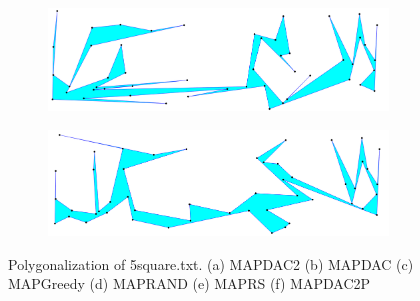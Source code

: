 \documentclass[conference]{IEEEtran}
\begin{document}
\begin{figure}[htbp]
			\begin{subfigure}{0.85\linewidth}
				\centering
				\includegraphics[width=0.99\textwidth]{fig6e.png}
				\caption{}
				\label{fig6e}
			\end{subfigure}
			
			\begin{subfigure}{0.85\linewidth}
				\centering
				\includegraphics[width=0.99\textwidth]{fig6f.png}
				\caption{}
				\label{fig6f}
			\end{subfigure}
			
			\caption
			{
				Polygonalization of 5{\textunderscore}square.txt.
				(a) MAP{\textunderscore}DAC2
				(b) MAP{\textunderscore}DAC
				(c) MAP{\textunderscore}Greedy
				(d) MAP{\textunderscore}RAND
				(e) MAP{\textunderscore}RS
				(f) MAP{\textunderscore}DAC2{\textunderscore}P
			}
			\label{fig6}
		\end{figure}
		
\end{document}
